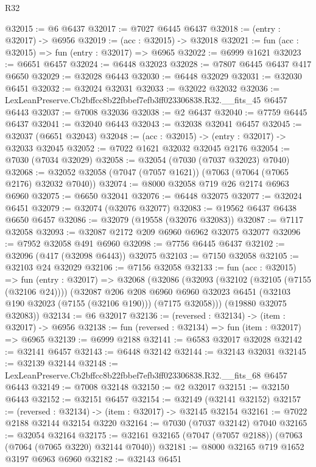 \begin{lexlean}{R32}
\begin{coremodule}
@32015 := @6 @6437
@32017 := @7027 @6445 @6437
@32018 := (entry : @32017) -> @6956
@32019 := (acc : @32015) -> @32018
@32021 := fun (acc : @32015) => fun (entry : @32017) => @6965
@32022 := @6999 @1621
@32023 := @6651 @6457
@32024 := @6448 @32023
@32028 := @7807 @6445 @6437 @417 @6650
@32029 := @32028 @6443
@32030 := @6448 @32029
@32031 := @32030 @6451
@32032 := @32024 @32031
@32033 := @32022 @32032
@32036 := LexLeanPreserve.Cb2bffcc8b22fbbef7efb3ff023306838.R32.__fits_45 @6457 @6443
@32037 := @7008 @32036
@32038 := @2 @6437
@32040 := @7759 @6445 @6437
@32041 := @32040 @6443
@32043 := @32038 @32041 @6457
@32045 := @32037 (@6651 @32043)
@32048 := (acc : @32015) -> (entry : @32017) -> @32033 @32045
@32052 := @7022 @1621 @32032 @32045 @2176
@32054 := @7030 (@7034 @32029)
@32058 := @32054 (@7030 (@7037 @32023) @7040)
@32068 := @32052 @32058 (@7047 (@7057 @1621)) (@7063 (@7064 (@7065 @2176) @32032 @7040))
@32074 := @8000 @32058 @719 @26 @2174 @6963 @6960
@32075 := @6650 @32041
@32076 := @6448 @32075
@32077 := @32024 @6451
@32079 := @32074 (@32076 @32077)
@32083 := @19562 @6437 @6438 @6650 @6457
@32086 := @32079 (@19558 (@32076 @32083))
@32087 := @7117 @32058
@32093 := @32087 @2172 @209 @6960 @6962 @32075 @32077
@32096 := @7952 @32058 @491 @6960
@32098 := @7756 @6445 @6437
@32102 := @32096 (@417 (@32098 @6443)) @32075
@32103 := @7150 @32058
@32105 := @32103 @24 @32029
@32106 := @7156 @32058
@32133 := fun (acc : @32015) =>
  fun (entry : @32017) =>
  @32068
    (@32086
      (@32093
        (@32102 (@32105 (@7155 (@32106 @24))))
        (@32087
          @206
          @208
          @6960
          @6960
          @32023
          @6451
          (@32103 @190 @32023 (@7155 (@32106 @190)))
          (@7175 @32058)))
      (@19880 @32075 @32083))
@32134 := @6 @32017
@32136 := (reversed : @32134) -> (item : @32017) -> @6956
@32138 := fun (reversed : @32134) => fun (item : @32017) => @6965
@32139 := @6999 @2188
@32141 := @6583 @32017 @32028
@32142 := @32141 @6457
@32143 := @6448 @32142
@32144 := @32143 @32031
@32145 := @32139 @32144
@32148 := LexLeanPreserve.Cb2bffcc8b22fbbef7efb3ff023306838.R32.__fits_68 @6457 @6443
@32149 := @7008 @32148
@32150 := @2 @32017
@32151 := @32150 @6443
@32152 := @32151 @6457
@32154 := @32149 (@32141 @32152)
@32157 := (reversed : @32134) -> (item : @32017) -> @32145 @32154
@32161 := @7022 @2188 @32144 @32154 @3220
@32164 := @7030 (@7037 @32142) @7040
@32165 := @32054 @32164
@32175 := @32161 @32165 (@7047 (@7057 @2188)) (@7063 (@7064 (@7065 @3220) @32144 @7040))
@32181 := @8000 @32165 @719 @1652 @3197 @6963 @6960
@32182 := @32143 @6451

\end{coremodule}
\end{lexlean}
